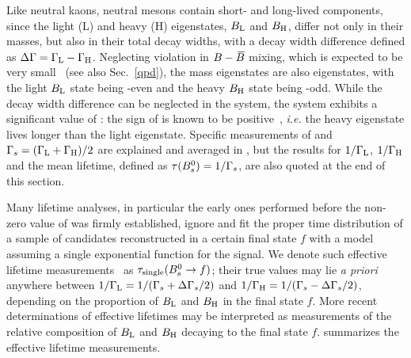 %
%
%


Like neutral kaons, neutral \B mesons contain
short- and long-lived components, since the
light (L) and heavy (H)
eigenstates, $B_{\rm L}$ and $B_{\rm H}$, differ not only
in their masses, but also in their total decay widths,  
with a decay width difference defined as 
$\Delta\Gamma = \Gamma_{\rm L} - \Gamma_{\rm H}$. 
Neglecting \CP violation in $B-\kern 0.18em\overline{\kern -0.18em B}{}$ mixing, 
which is expected to be very
small~\cite{Lenz:2011ti,*Lenz:2006hd,Beneke:1998sy} (see also Sec.~\ref{qpd}),
the mass eigenstates are also \CP eigenstates,
with the light $B_{\rm L}$ state being \CP-even 
and the heavy $B_{\rm H}$ state being \CP-odd. 
While the decay width difference \DGd can be neglected in the \Bd system, 
the \Bs system exhibits a significant
value of \DGs: the sign of \DGs is known 
to be positive~\cite{Aaij:2012eq}, {\em i.e.}
the heavy eigenstate lives longer than the light eigenstate. 
Specific measurements of \DGs and 
$\Gamma_{s} = (\Gamma_{\rm L} + \Gamma_{\rm H})/2$ are explained
and averaged in , but the results for
$1/\Gamma_{\rm L}$, $1/\Gamma_{\rm H}$ and
the mean \Bs lifetime, defined as $\tau(B^0_s) = 1/\Gamma_{s}$,
are also quoted at the end of this section. 

Many \Bs lifetime analyses, in particular the early 
ones performed before the non-zero value of \DGs was 
firmly established, ignore \DGs and fit the proper time 
distribution of a sample of \Bs candidates 
reconstructed in a certain final state $f$
with a model assuming a single exponential function 
for the signal. We denote such {\rm effective lifetime}
measurements~\cite{Fleischer:2011cw} as $\tau_{\rm single}(B^0_s\to f)$; 
their true values may lie {\em a priori} anywhere
between $1/\Gamma_{\rm L} = 1/(\Gamma_{s}+\Delta\Gamma_{s}/2)$ and
$1/\Gamma_{\rm H}= 1/(\Gamma_{s}-\Delta\Gamma_{s}/2)$, 
depending on the proportion of $B_{\rm L}$ and $B_{\rm H}$
in the final state $f$. 
More recent determinations of effective lifetimes may be interpreted as
measurements of the relative composition of $B_{\rm L}$ and $B_{\rm H}$
decaying to the final state $f$. 
 summarizes the effective 
lifetime measurements.

